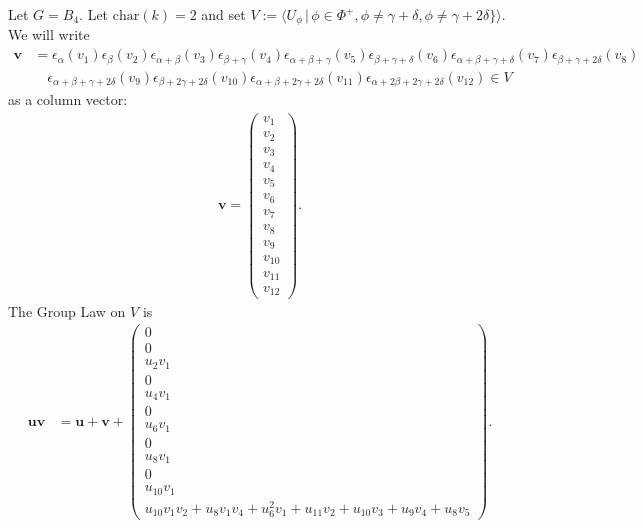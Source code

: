 Let $G = B_4$. Let $\mathrm{char}(k)=2$ and set $V:=\langle U_\phi\, |\, \phi \in \Phi^+, \phi \neq \gamma + \delta,\phi \neq \gamma+2\delta\} \rangle$. We will write
\begin{align*}
\mathbf{v} &= \epsilon_\alpha(v_1) \epsilon_\beta(v_2) \epsilon_{\alpha+\beta}(v_3) \epsilon_{\beta+\gamma}(v_4) \epsilon_{\alpha+\beta+\gamma}(v_5) \epsilon_{\beta+\gamma+\delta}(v_6) \epsilon_{\alpha+\beta+\gamma+\delta}(v_7) \epsilon_{\beta+\gamma+2\delta}(v_8)\\ 
&\quad\epsilon_{\alpha+\beta+\gamma+2\delta}(v_9)\epsilon_{\beta+2\gamma+2\delta}(v_{10}) \epsilon_{\alpha+\beta+2\gamma+2\delta}(v_{11}) \epsilon_{\alpha+2\beta+2\gamma+2\delta}(v_{12}) \in V
\end{align*}
as a column vector:
\begin{align*}
\mathbf{v} = \left( \begin{matrix}
	         v_1 \\
	         v_2 \\
	         v_3 \\
	         v_4 \\
	         v_5 \\
	         v_6 \\
	         v_7 \\
	         v_8 \\
	         v_9 \\
	         v_{10} \\
	         v_{11} \\
	         v_{12} 
	      \end{matrix}\right). 
\end{align*}
The Group Law on $V$ is
\begin{align*}
	     \mathbf{u}
	     \mathbf{v}&=
	     \mathbf{u} + \mathbf{v} +
	     \left( \begin{matrix}
	         0 \\
	         0 \\
	         u_2v_1\\
	         0 \\
	         u_4v_1 \\
	         0 \\
	         u_6v_1\\
	         0 \\
	         u_8v_1\\
	         0 \\
	         u_{10}v_1\\
	         u_{10}v_1v_2 + u_8v_1v_4 + u_6^2v_1 + u_{11}v_2 + u_{10}v_3 + u_9v_4 + u_8v_5
	         	\end{matrix}\right).
\end{align*}

